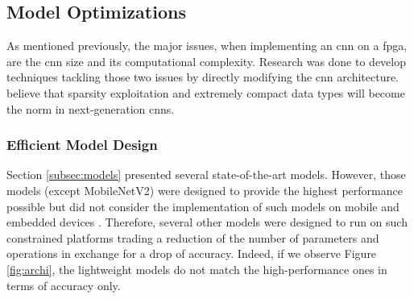 \subsection{Model Optimizations} \label{subsec:mdopti}
As mentioned previously, the major issues, when implementing an \acrshort{cnn} on a \acrshort{fpga}, are the \acrshort{cnn} size and its computational complexity. Research was done to develop techniques tackling those two issues by directly modifying the \acrshort{cnn} architecture. \textcite{nurvitadhi_can_2017} believe that sparsity exploitation and extremely compact data types will become the norm in next-generation \acrshort{cnn}s.
%
%
\subsubsection{Efficient Model Design}
%
Section \ref{subsec:models} presented several state-of-the-art models. However, those models (except MobileNetV2) were designed to provide the highest performance possible but did not consider the implementation of such models on mobile and embedded devices \cite{iandola_squeezenet_2016}. Therefore, several other models were designed to run on such constrained platforms trading a reduction of the number of parameters and operations in exchange for a drop of accuracy. Indeed, if we observe Figure \ref{fig:archi}, the lightweight models do not match the high-performance ones in terms of accuracy only.

